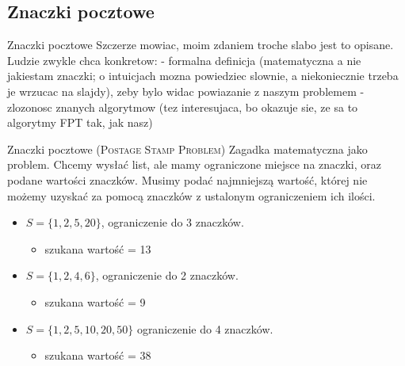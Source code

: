 \documentclass{beamer}
\begin{document}
	\subsection{Znaczki pocztowe}
		\begin{frame}{Znaczki pocztowe}
			Szczerze mowiac, moim zdaniem troche slabo jest to opisane. Ludzie zwykle chca konkretow:
			- formalna definicja (matematyczna a nie jakiestam znaczki; o intuicjach mozna powiedziec slownie, a niekoniecznie trzeba je wrzucac na slajdy), zeby bylo widac powiazanie z naszym problemem
			- zlozonosc znanych algorytmow (tez interesujaca, bo okazuje sie, ze sa to algorytmy FPT tak, jak nasz)
			\begin{block}{Znaczki pocztowe (\rmfamily \textsc{Postage Stamp Problem})}
                Zagadka matematyczna jako problem.
                Chcemy wysłać list, ale mamy ograniczone miejsce na znaczki, oraz podane wartości znaczków.
                Musimy podać najmniejszą wartość, której nie możemy uzyskać za pomocą znaczków z ustalonym ograniczeniem ich ilości.
                \begin{itemize}
				    \pause \item $ S = \lbrace 1, 2, 5, 20 \rbrace $, ograniczenie do 3 znaczków.
                        \begin{itemize}
                            \item szukana wartość = 13
                        \end{itemize}
				    \pause \item $ S = \lbrace 1, 2, 4, 6 \rbrace $, ograniczenie do 2 znaczków.
                        \begin{itemize}
                            \item szukana wartość = 9
                        \end{itemize}
				    \pause \item $ S =  \lbrace 1, 2, 5, 10, 20, 50 \rbrace $ ograniczenie do 4 znaczków.
                        \begin{itemize}
                            \item szukana wartość = 38
                        \end{itemize}
                \end{itemize}
			\end{block}
		\end{frame}
		
\end{document}
